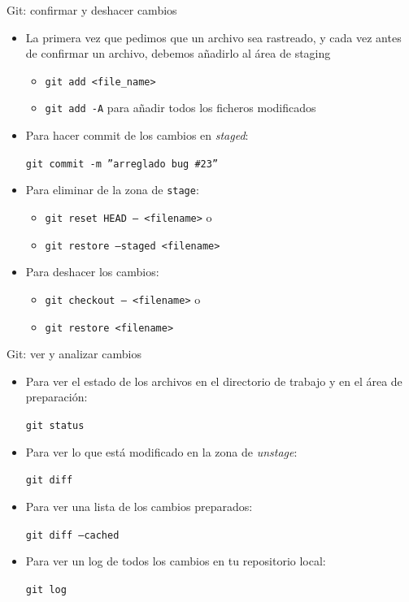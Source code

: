 \documentclass{beamer}
\begin{document}
\begin{frame}{Git: confirmar y deshacer cambios}

\begin{itemize}
    \item La primera vez que pedimos que un archivo sea rastreado, y cada vez
antes de confirmar un archivo, debemos añadirlo al área de staging

\begin{itemize}
    \item \texttt{git add <file\_name>}
    \item \texttt{git add -A} para añadir todos los ficheros modificados
\end{itemize}

    \item Para hacer commit de los cambios en \textit{staged}: 
    
    \texttt{git commit -m ''arreglado bug \#23''}

    \item Para eliminar de la zona de \texttt{stage}:

    \begin{itemize}
        \item \texttt{git reset HEAD -- <filename>} o 
        \item \texttt{git restore --staged <filename>}
    \end{itemize}

    \item Para deshacer los cambios:
    \begin{itemize}
        \item \texttt{git checkout -- <filename>} o 
        \item \texttt{git restore  <filename>}
    \end{itemize}
\end{itemize}
    
\end{frame}

\begin{frame}{Git: ver y analizar cambios}

\begin{itemize}
    \item Para ver el estado de los archivos en el directorio de trabajo y en el área de preparación:

    \texttt{git status}

    \item Para ver lo que está modificado en la zona de \textit{unstage}:

    \texttt{git diff}

    \item Para ver una lista de los cambios preparados:

    \texttt{git diff --cached}

    \item Para ver un log de todos los cambios en tu repositorio local:

    \texttt{git log}
\end{itemize}
    
\end{frame}
\end{document}
